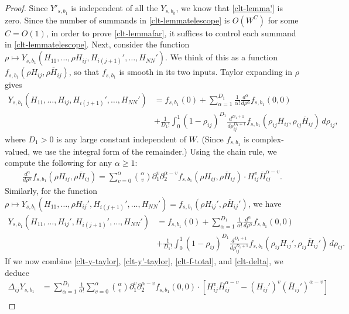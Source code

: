 \begin{proof}
Since $Y'_{s,b_{1}}$ is independent of all the $Y_{s,b_{k}}$, we know that \eqref{clt-lemma'} is zero. Since the number of summands in \eqref{clt-lemmatelescope} is $O(W^{C})$ for some $C=O(1)$, in order to prove \eqref{clt-lemmafar}, it suffices to control each summand in \eqref{clt-lemmatelescope}. Next, consider the function $\rho\mapsto Y_{s,b_{1}}(H_{11},\ldots,\rho H_{ij},H_{i(j+1)}',\ldots,H_{NN}')$. We think of this as a function $f_{s,b_{1}}(\rho H_{ij},\rho\overline{H}_{ij})$, so that $f_{s,b_{1}}$ is smooth in its two inputs. Taylor expanding in $\rho$ gives
%
\begin{align}
Y_{s,b_{1}}(H_{11},\ldots,H_{ij},H_{i(j+1)}',\ldots,H_{NN}')&=f_{s,b_{1}}(0)+\sum_{\alpha=1}^{D_{1}}\frac{1}{\alpha!}\frac{d^{\alpha}}{d\rho^{\alpha}}f_{s,b_{1}}(0,0)\nonumber\\
&+\frac{1}{D_{1}!}\int_{0}^{1}(1-\rho_{ij})^{D_{1}}\frac{d^{D_{1}+1}}{d\rho_{ij}^{D_{1}+1}}f_{s,b_{1}}(\rho_{ij}H_{ij},\rho_{ij}\overline{H}_{ij})\,d\rho_{ij},\label{clt-y-taylor}
\end{align}
%
where $D_{1}>0$ is any large constant independent of $W$. (Since $f_{s,b_{1}}$ is complex-valued, we use the integral form of the remainder.) Using the chain rule, we compute the following for any $\alpha\geq1$:
%
\begin{align}
\frac{d^{\alpha}}{d\rho^{\alpha}}f_{s,b_{1}}(\rho H_{ij},\rho\overline{H}_{ij})=\sum_{v=0}^{\alpha}\binom{\alpha}{v}\partial_{1}^{v}\partial_{2}^{\alpha-v}f_{s,b_{1}}(\rho H_{ij},\rho\overline{H}_{ij})\cdot H_{ij}^{v}\overline{H}_{ij}^{\alpha-v}.\label{clt-f-total}
\end{align}
%
Similarly, for the function $\rho\mapsto Y_{s,b_{1}}(H_{11},\ldots,\rho H_{ij}',H_{i(j+1)}',\ldots,H_{NN}')=f_{s,b_{1}}(\rho H_{ij}',\rho\overline{H}_{ij}')$, we have 
%
\begin{align}
Y_{s,b_{1}}(H_{11},\ldots,H_{ij}',H_{i(j+1)}',\ldots,H_{NN}')&=f_{s,b_{1}}(0)+\sum_{\alpha=1}^{D_{1}}\frac{1}{\alpha!}\frac{d^{\alpha}}{d\rho^{\alpha}}f_{s,b_{1}}(0,0)\\
&+\frac{1}{D_{1}!}\int_{0}^{1}(1-\rho_{ij})^{D_{1}}\frac{d^{D_{1}+1}}{d\rho_{ij}^{D_{1}+1}}f_{s,b_{1}}(\rho_{ij}H_{ij}',\rho_{ij}\overline{H}_{ij}')\,d\rho_{ij}.\label{clt-y'-taylor}
\end{align}
%
If we now combine \eqref{clt-y-taylor}, \eqref{clt-y'-taylor}, \eqref{clt-f-total}, and \eqref{clt-delta}, we deduce
%
\begin{align}
\Delta_{ij}Y_{s,b_{1}}&=\sum_{\alpha=1}^{D_{1}}\frac{1}{\alpha!}\sum_{v=0}^{\alpha}\binom{\alpha}{v}\partial_{1}^{v}\partial_{2}^{\alpha-v}f_{s,b_{1}}(0,0)\cdot\left[H_{ij}^{v}\overline{H}_{ij}^{\alpha-v}-(H_{ij}')^{v}(\overline{H}_{ij}')^{\alpha-v}\right]\\

\end{align}
\end{proof}
